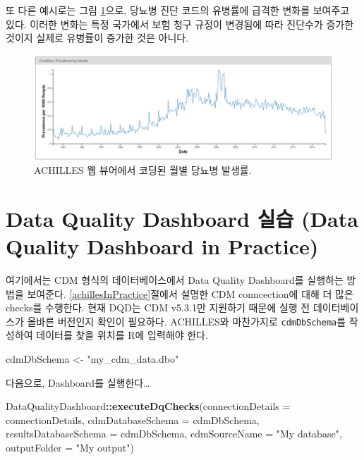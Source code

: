 \documentclass[10.5pt]{book}
\newenvironment{Shaded}{\begin{snugshade}}{\end{snugshade}}
\newcommand{\KeywordTok}[1]{\textcolor[rgb]{0.13,0.29,0.53}{\textbf{#1}}}
\newcommand{\DataTypeTok}[1]{\textcolor[rgb]{0.13,0.29,0.53}{#1}}
\newcommand{\StringTok}[1]{\textcolor[rgb]{0.31,0.60,0.02}{#1}}
\newcommand{\OperatorTok}[1]{\textcolor[rgb]{0.81,0.36,0.00}{\textbf{#1}}}
\newcommand{\NormalTok}[1]{#1}
\theoremstyle{definition}
\theoremstyle{definition}
\theoremstyle{definition}
\theoremstyle{remark}
\begin{document}
또 다른 예시로는 그림 \ref{fig:achillesCodeChange}으로, 당뇨병 진단
코드의 유병률에 급격한 변화를 보여주고 있다. 이러한 변화는 특정 국가에서
보험 청구 규정이 변경됨에 따라 진단수가 증가한 것이지 실제로 유병률이
증가한 것은 아니다.

\begin{figure}

{\centering \includegraphics[width=1\linewidth]{images/DataQuality/achillesCodeChange} 

}

\caption{ACHILLES 웹 뷰어에서 코딩된 월별 당뇨병 발생률.}\label{fig:achillesCodeChange}
\end{figure}

\section{Data Quality Dashboard 실습 (Data Quality Dashboard in
Practice)}\label{dqdInPractice}

여기에서는 CDM 형식의 데이터베이스에서 Data Quality Dashboard를 실행하는
방법을 보여준다. \ref{achillesInPractice}절에서 설명한 CDM conncection에
대해 더 많은 checks를 수행한다. 현재 DQD는 CDM v5.3.1만 지원하기 때문에
실행 전 데이터베이스가 올바른 버전인지 확인이 필요하다. ACHILLES와
마찬가지로 \texttt{cdmDbSchema}를 작성하여 데이터를 찾을 위치를 R에
입력해야 한다.

\begin{Shaded}
\begin{Highlighting}[]
\NormalTok{cdmDbSchema <-}\StringTok{ "my_cdm_data.dbo"}
\end{Highlighting}
\end{Shaded}

다음으로, Dashboard를 실행한다\ldots{}

\begin{Shaded}
\begin{Highlighting}[]
\NormalTok{DataQualityDashboard}\OperatorTok{::}\KeywordTok{executeDqChecks}\NormalTok{(}\DataTypeTok{connectionDetails =}\NormalTok{ connectionDetails, }
                                      \DataTypeTok{cdmDatabaseSchema =}\NormalTok{ cdmDbSchema, }
                                      \DataTypeTok{resultsDatabaseSchema =}\NormalTok{ cdmDbSchema,}
                                      \DataTypeTok{cdmSourceName =} \StringTok{"My database"}\NormalTok{,}
                                      \DataTypeTok{outputFolder =} \StringTok{"My output"}\NormalTok{)}
\end{Highlighting}
\end{Shaded}
\end{document}
